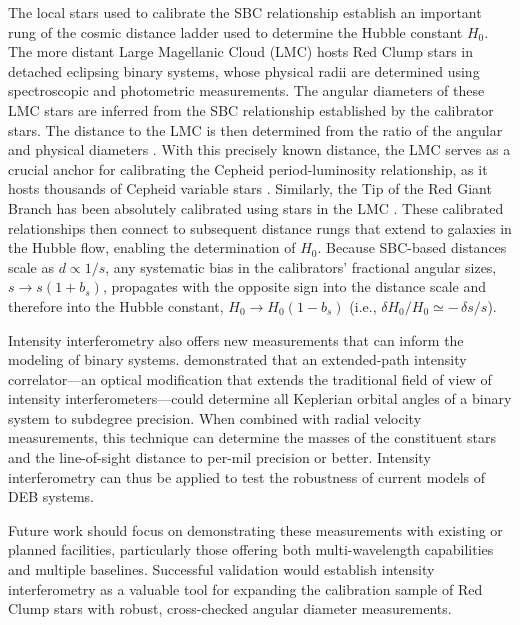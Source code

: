 \documentclass[linenumbers,trackchanges]{aastex701}
\begin{document}
The local stars used to calibrate the SBC relationship establish an important rung of the cosmic distance ladder used to determine the Hubble constant $H_0$.
The more distant Large Magellanic Cloud (LMC) hosts Red Clump stars in detached eclipsing binary systems, whose physical radii are determined using spectroscopic and photometric measurements. The angular diameters of these LMC stars are inferred from the SBC relationship established by the calibrator stars. The distance to the LMC is then determined from the ratio of the angular and physical diameters \citep{2019Natur.567..200P}.
With this precisely known distance, the LMC serves as a crucial anchor for calibrating the Cepheid period-luminosity relationship, as it hosts thousands of Cepheid variable stars
\citep{Riess_2019}.  Similarly, the Tip of the Red Giant Branch has been absolutely calibrated
using stars in the LMC \citep{2018ApJ...858...12H}. These calibrated relationships then connect to subsequent distance rungs that extend to galaxies in the Hubble flow, enabling the determination of $H_0$.
Because SBC-based distances scale as $d \propto 1/s$, any systematic bias in the calibrators' fractional angular sizes, $s \rightarrow s(1+b_s)$, propagates with the opposite sign into the distance scale and therefore into the Hubble constant, $H_0 \rightarrow H_0(1-b_s)$ (i.e., $\delta H_0/H_0 \simeq -\,\delta s/s$).

Intensity interferometry also offers new measurements that can inform the modeling of binary systems. \citet{wqz5-2jjs} demonstrated that an extended-path intensity correlator—an optical modification that extends the traditional field of view of intensity interferometers—could determine all Keplerian orbital angles of a binary system to subdegree precision. When combined with radial velocity measurements, this technique can determine the masses of the constituent stars and the line-of-sight distance to per-mil precision or better. Intensity interferometry can thus be applied to test the robustness of current models of DEB systems.

Future work should focus on demonstrating these measurements with existing or planned facilities, particularly those offering both multi-wavelength capabilities and multiple baselines. Successful validation would establish intensity interferometry as a valuable tool for expanding the calibration sample of Red Clump stars with robust, cross-checked angular diameter measurements.



\end{document}
